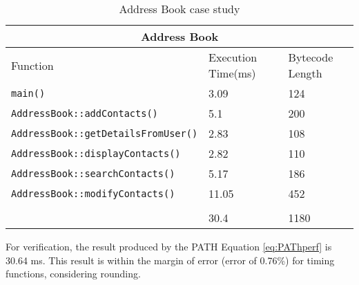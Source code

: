 \begin{description}
\begin{lstlisting}[float,language=bash,caption= \textit{resources/SimpleIR.facts},label=lst:funcIR,numbers=none]
            \end{lstlisting}
            
            \begin{table}[ht]
                \centering
                \begin{tabular}{|p{4.7cm}|p{3.3cm}|p{4cm}|}
                    \hline
                    \multicolumn{3}{|c|}{{\bfseries Address Book }} \\
                    \hline
                    Function & Execution Time(ms) & Bytecode Length \\
                    \hhline{|===|}
                    \lstinline|main()| & 3.09 & 124\\
                    \hline
                    \lstinline|AddressBook::addContacts()| & 5.1 & 200 \\
                    \hline
                    \lstinline|AddressBook::getDetailsFromUser()| & 2.83 & 108\\
                    \hline
                    \lstinline|AddressBook::displayContacts()| & 2.82 & 110\\
                    \hline
                    \lstinline|AddressBook::searchContacts()| & 5.17 & 186\\
                    \hline
                    \lstinline|AddressBook::modifyContacts()| & 11.05 & 452\\
                    \hhline{|===|}
                    \multicolumn{3}{|c|}{{\bfseries Totals }} \\
                    \hhline{|===|}
                    & 30.4 & 1180 \\
                    \hline
                \end{tabular}
                \caption{Address Book case study}
                \label{table:casestudy}
            \end{table}
            \normalsize
            \par For verification, the result produced by the \acs{PATH} Equation \ref{eq:PAThperf} is 30.64 ms. This result is within the margin of error (error of 0.76\%) for timing functions, considering rounding.

        \end{description}